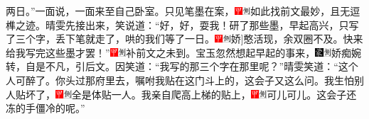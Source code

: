 两日。”一面说，一面来至自己卧室。只见笔墨在案，{\includegraphics[width=3mm]{../Images/00002}\includegraphics[width=3mm]{../Images/00011}\footnotesize \kaishu 如此找前文最妙，且无逗榫之迹。}晴雯先接出来，笑说道：“好，好，耍我！研了那些墨，早起高兴，只写了三个字，丢下笔就走了，哄的我们等了一日。{\includegraphics[width=3mm]{../Images/00002}\includegraphics[width=3mm]{../Images/00011}\footnotesize \kaishu {[}娇{]}憨活现，余双圈不及。}快来给我写完这些墨才罢！”{\includegraphics[width=3mm]{../Images/00002}\includegraphics[width=3mm]{../Images/00011}\footnotesize \kaishu 补前文之未到。}宝玉忽然想起早起的事来，{\includegraphics[width=3mm]{../Images/00006}\includegraphics[width=3mm]{../Images/00011}\footnotesize \kaishu 娇痴婉转，自是不凡，引后文。}因笑道：“我写的那三个字在那里呢？”晴雯笑道：“这个人可醉了。你头过那府里去，嘱咐我贴在这门斗上的，这会子又这么问。我生怕别人贴坏了，{\includegraphics[width=3mm]{../Images/00002}\includegraphics[width=3mm]{../Images/00011}\footnotesize \kaishu 全是体贴一人。}我亲自爬高上梯的贴上，{\includegraphics[width=3mm]{../Images/00002}\includegraphics[width=3mm]{../Images/00011}\footnotesize \kaishu 可儿可儿。}这会子还冻的手僵冷的呢。”{
}
